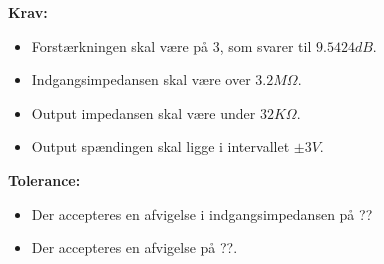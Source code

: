 \noindent\textbf{Krav:}
\begin{itemize}
	\item Forstærkningen skal være på 3, som svarer til $9.5424dB$.
	\item Indgangsimpedansen skal være over $3.2M\Omega$.
	\item Output impedansen skal være under $32K\Omega$.
	\item Output spændingen skal ligge i intervallet $\pm3V$.
\end{itemize}
\noindent\textbf{Tolerance:}
\begin{itemize}
	\item Der accepteres en afvigelse i indgangsimpedansen på ??
	\item Der accepteres en afvigelse på ??.
\end{itemize}
